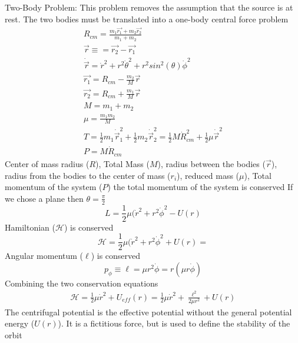 \documentclass[12pt]{article}
\begin{document}
    Two-Body Problem: This problem removes the assumption that the source is at rest. The two bodies must be translated into a one-body central force problem
    \begin{gather*}
        R_{cm} = \frac{m_1 \vec{r_1} + m_2 \vec{r_2}}{m_1 + m_2}
        \\ \vec{r} \equiv = \vec{r_2} - \vec{r_1}
        \\ \dot{\vec{r}} = \dot{r}^2 + r^2 \dot{\theta}^2 + r^2 sin^2(\theta) \dot{\phi}^2
        \\ \vec{r_1} = R_{cm} - \frac{m_2}{M} \vec{r}
        \\ \vec{r_2} = R_{cm} + \frac{m_1}{M} \vec{r}
        \\ M = m_1 + m_2
        \\ \mu = \frac{m_1 m_2}{M}
        \\ T = \frac{1}{2} m_1 \dot{\vec{r}}_1^2 + \frac{1}{2} m_2 \dot{\vec{r}}_2^2 = \frac{1}{2} M \dot{R}_{cm}^2 + \frac{1}{2} \mu \dot{\vec{r}}^2
        \\ P = M \dot{R}_{cm}
    \end{gather*}
    Center of mass radius ($R$), Total Mass ($M$), radius between the bodies ($\vec{r}$), radius from the bodies to the center of mass ($r_i$), reduced mass ($\mu$), Total momentum of the system ($P$)
    \newline the total momentum of the system is conserved
    If we chose a plane then $\theta = \frac{\pi}{2}$
    \begin{equation}
        L = \frac{1}{2} \mu (\dot{r}^2 + r^2 \dot{\phi}^2 - U(r)
    \end{equation}
    Hamiltonian ($\mathcal{H}$) is conserved
    \begin{equation}
         \mathcal{H} = \frac{1}{2} \mu (\dot{r}^2 + r^2 \dot{\phi}^2 + U(r) = 
    \end{equation}
    Angular momentum ($\ell$) is conserved
    \begin{equation}
        p_\phi \equiv \ell = \mu r^2 \dot{\phi} = r (\mu r \dot{\phi})
    \end{equation}
    Combining the two conservation equations 
    \begin{gather*}
        \mathcal{H} = \frac{1}{2}\mu \dot{r}^2 + U_{eff}(r) = \frac{1}{2}\mu \dot{r}^2 + \frac{\ell^2}{2 \mu r^2} + U(r)
    \end{gather*}
    The centrifugal potential is the effective potential without the general potential energy ($U(r)$). It is a fictitious force, but is used to define the stability of the orbit
\end{document}
